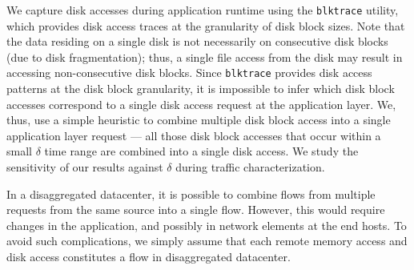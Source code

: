 We capture disk accesses during application runtime using the {\tt blktrace} utility, which provides disk access traces at the granularity of disk block sizes. Note that the data residing on a single disk is not necessarily on consecutive disk blocks (due to disk fragmentation); thus, a single file access from the disk may result in accessing non-consecutive disk blocks. Since {\tt blktrace} provides disk access patterns at the disk block granularity, it is impossible to infer which disk block accesses correspond to a single disk access request at the application layer. We, thus, use a simple heuristic to combine multiple disk block access into a single application layer request --- all those disk block accesses that occur within a small $\delta$ time range are combined into a single disk access. We study the sensitivity of our results against $\delta$ during traffic characterization. 


In a disaggregated datacenter, it is possible to combine flows from multiple requests from the same source into a single flow. However, this would require changes in the application, and possibly in network elements at the end hosts. To avoid such complications, we simply assume that each remote memory access and disk access constitutes a flow in disaggregated datacenter.


%
\begin{figure}
  \centering
  \caption{\small{}}
  \label{fig:fsd}
\end{figure}
%

